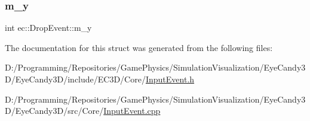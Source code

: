 \mbox{\label{structec_1_1_drop_event_a59338dd4b8cd47b7f025908a63be2e92}} 
\subsubsection{\texorpdfstring{m\+\_\+y}{m\_y}}
{\footnotesize\ttfamily int ec\+::\+Drop\+Event\+::m\+\_\+y}



The documentation for this struct was generated from the following files\+:\begin{DoxyCompactItemize}
\item 
D\+:/\+Programming/\+Repositories/\+Game\+Physics/\+Simulation\+Visualization/\+Eye\+Candy3\+D/\+Eye\+Candy3\+D/include/\+E\+C3\+D/\+Core/\mbox{\hyperlink{_input_event_8h}{Input\+Event.\+h}}\item 
D\+:/\+Programming/\+Repositories/\+Game\+Physics/\+Simulation\+Visualization/\+Eye\+Candy3\+D/\+Eye\+Candy3\+D/src/\+Core/\mbox{\hyperlink{_input_event_8cpp}{Input\+Event.\+cpp}}\end{DoxyCompactItemize}

